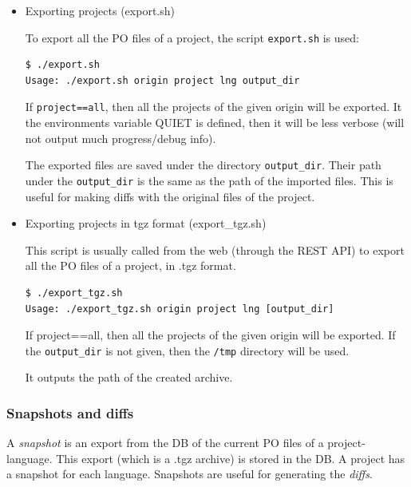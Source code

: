 \documentclass[11pt]{article}
\begin{document}
\begin{itemize}
\item Exporting projects (export.sh)\\
\label{sec-8.4.3.2}


     To export all the PO files of a project, the script \texttt{export.sh} is
     used:

\begin{verbatim}
$ ./export.sh
Usage: ./export.sh origin project lng output_dir
\end{verbatim}



     If \texttt{project==all}, then all the projects of the given origin will be
     exported. It the environments variable QUIET is defined, then it
     will be less verbose (will not output much progress/debug info).

     The exported files are saved under the directory \texttt{output\_dir}.
     Their path under the \texttt{output\_dir} is the same as the path of the
     imported files. This is useful for making diffs with the original
     files of the project.


\item Exporting projects in tgz format (export\_{}tgz.sh)\\
\label{sec-8.4.3.3}


     This script is usually called from the web (through the REST API)
     to export all the PO files of a project, in .tgz format.

\begin{verbatim}
$ ./export_tgz.sh
Usage: ./export_tgz.sh origin project lng [output_dir]
\end{verbatim}



     If project==all, then all the projects of the given origin will be
     exported. If the \texttt{output\_dir} is not given, then the \texttt{/tmp}
     directory will be used.

     It outputs the path of the created archive.


\end{itemize} %
\subsubsection{Snapshots and diffs}
\label{sec-8.4.4}


    A \emph{snapshot} is an export from the DB of the current PO files of a
    project-language. This export (which is a .tgz archive) is stored in
    the DB. A project has a snapshot for each language. Snapshots are
    useful for generating the \emph{diffs}.
\end{document}
